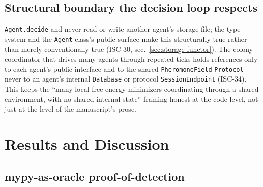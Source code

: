 \documentclass[
  english,
]{article}
\theoremstyle{definition}
\begin{document}
\subsection{Structural boundary the decision loop
respects}\label{structural-boundary-the-decision-loop-respects}

\texttt{Agent.decide} and  never read
or write another agent's storage file; the type system and the
\texttt{Agent} class's public surface make this structurally true rather
than merely conventionally true (ISC-30,
sec.~\ref{sec:storage-functor}). The colony coordinator that drives many
agents through repeated ticks holds references only to each agent's
public interface and to the shared \texttt{PheromoneField}
\texttt{Protocol} --- never to an agent's internal \texttt{Database} or
protocol \texttt{SessionEndpoint} (ISC-34). This keeps the ``many local
free-energy minimizers coordinating through a shared environment, with
no shared internal state'' framing honest at the code level, not just at
the level of the manuscript's prose.

\newpage

\section{Results and Discussion}\label{sec:results-discussion}

\subsection{mypy-as-oracle
proof-of-detection}\label{mypy-as-oracle-proof-of-detection}
\end{document}

